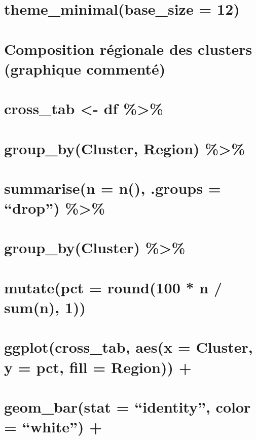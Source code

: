 \documentclass[
]{article}
\begin{document}
\section{theme\_minimal(base\_size =
12)}\label{theme_minimalbase_size-12-3}

\section{Composition régionale des clusters (graphique
commenté)}\label{composition-ruxe9gionale-des-clusters-graphique-commentuxe9}

\section{cross\_tab \textless- df
\%\textgreater\%}\label{cross_tab---df}

\section{group\_by(Cluster, Region)
\%\textgreater\%}\label{group_bycluster-region}

\section{summarise(n = n(), .groups = ``drop'')
\%\textgreater\%}\label{summarisen-n-.groups-drop}

\section{group\_by(Cluster) \%\textgreater\%}\label{group_bycluster}

\section{mutate(pct = round(100 * n / sum(n),
1))}\label{mutatepct-round100-n-sumn-1}

\section{ggplot(cross\_tab, aes(x = Cluster, y = pct, fill = Region))
+}\label{ggplotcross_tab-aesx-cluster-y-pct-fill-region}

\section{geom\_bar(stat = ``identity'', color = ``white'')
+}\label{geom_barstat-identity-color-white}
\end{document}
